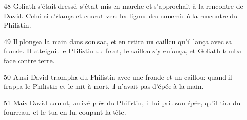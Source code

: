 

48 Goliath s’était dressé, s’était mis en marche et s’approchait à la rencontre de David. Celui-ci s’élança et courut vers les lignes des ennemis à la rencontre du Philistin.

49 Il plongea la main dans son sac, et en retira un caillou qu’il lança avec sa fronde. Il atteignit le Philistin au front, le caillou s’y enfonça, et Goliath tomba face contre terre.

50 Ainsi David triompha du Philistin avec une fronde et un caillou: quand il frappa le Philistin et le mit à mort, il n’avait pas d’épée à la main.

51 Mais David courut; arrivé près du Philistin, il lui prit son épée, qu’il tira du fourreau, et le tua en lui coupant la tête.